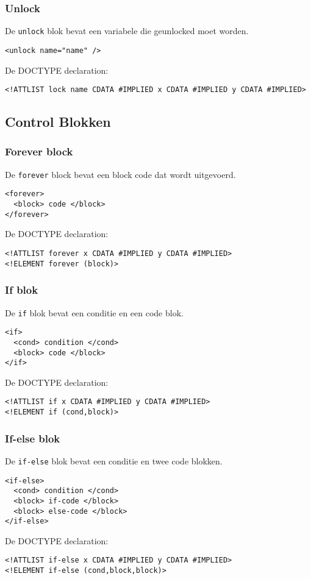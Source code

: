 \documentclass[]{article}
\begin{document}
\subsubsection{Unlock}
De \texttt{unlock} blok bevat een variabele die geunlocked moet worden.	
\lstset{language=XML}
\begin{lstlisting}
<unlock name="name" />
\end{lstlisting}
De DOCTYPE declaration: 
\lstset{language=XML}
\begin{lstlisting}
<!ATTLIST lock name CDATA #IMPLIED x CDATA #IMPLIED y CDATA #IMPLIED>
\end{lstlisting}

\subsection{Control Blokken}
\subsubsection{Forever block}
De \texttt{forever} block bevat een block code dat wordt uitgevoerd.
\lstset{language=XML}
\begin{lstlisting}
<forever>
  <block> code </block>
</forever>
\end{lstlisting}
De DOCTYPE declaration: 
\lstset{language=XML}
\begin{lstlisting}
<!ATTLIST forever x CDATA #IMPLIED y CDATA #IMPLIED>
<!ELEMENT forever (block)>
\end{lstlisting}
\subsubsection{If blok}
De \texttt{if} blok bevat een conditie en een code blok.
\lstset{language=XML}
\begin{lstlisting}
<if>
  <cond> condition </cond>
  <block> code </block>
</if>
\end{lstlisting}
De DOCTYPE declaration: 
\lstset{language=XML}
\begin{lstlisting}
<!ATTLIST if x CDATA #IMPLIED y CDATA #IMPLIED>
<!ELEMENT if (cond,block)>
\end{lstlisting}
\subsubsection{If-else blok}
De \texttt{if-else} blok bevat een conditie en twee code blokken.
\lstset{language=XML}
\begin{lstlisting}
<if-else>
  <cond> condition </cond>
  <block> if-code </block>
  <block> else-code </block>
</if-else>
\end{lstlisting}
De DOCTYPE declaration: 
\lstset{language=XML}
\begin{lstlisting}
<!ATTLIST if-else x CDATA #IMPLIED y CDATA #IMPLIED>
<!ELEMENT if-else (cond,block,block)>
\end{lstlisting}
\end{document}
